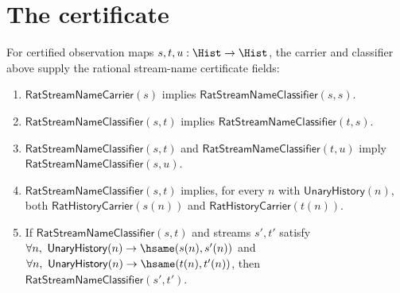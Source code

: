 \section{The certificate}
\label{sec:streamname-certificate}

\begin{theorem}
\label{thm:rat-stream-name-certificate-fields}
For certified observation maps $s,t,u:\Hist\to\Hist$, the carrier and
classifier above supply the rational stream-name certificate fields:
\begin{enumerate}
  \item $\mathsf{RatStreamNameCarrier}(s)$ implies
  $\mathsf{RatStreamNameClassifier}(s,s)$.
  \item $\mathsf{RatStreamNameClassifier}(s,t)$ implies
  $\mathsf{RatStreamNameClassifier}(t,s)$.
  \item $\mathsf{RatStreamNameClassifier}(s,t)$ and
  $\mathsf{RatStreamNameClassifier}(t,u)$ imply
  $\mathsf{RatStreamNameClassifier}(s,u)$.
  \item $\mathsf{RatStreamNameClassifier}(s,t)$ implies, for every $n$ with
  $\mathsf{UnaryHistory}(n)$, both $\mathsf{RatHistoryCarrier}(s(n))$ and
  $\mathsf{RatHistoryCarrier}(t(n))$.
  \item If $\mathsf{RatStreamNameClassifier}(s,t)$ and streams $s',t'$ satisfy
  $\forall n,\ \mathsf{UnaryHistory}(n)\to\hsame(s(n),s'(n))$ and
  $\forall n,\ \mathsf{UnaryHistory}(n)\to\hsame(t(n),t'(n))$, then
  $\mathsf{RatStreamNameClassifier}(s',t')$.
\end{enumerate}
\end{theorem}
